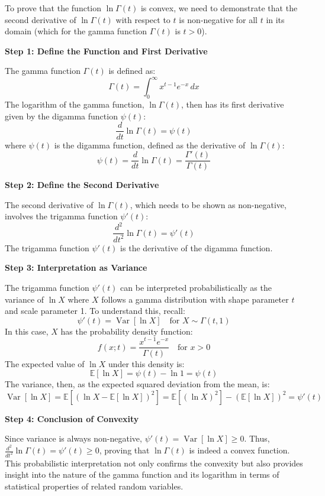 \documentclass[8pt]{article}
\begin{document}
To prove that the function \(\ln \Gamma(t)\) is convex, we need to demonstrate that the second derivative of \(\ln \Gamma(t)\) with respect to \(t\) is non-negative for all \(t\) in its domain (which for the gamma function \(\Gamma(t)\) is \(t > 0\)).

\textbf{Step 1: Define the Function and First Derivative}

The gamma function \(\Gamma(t)\) is defined as:
\[
\Gamma(t) = \int_0^\infty x^{t-1} e^{-x} \, dx
\]
The logarithm of the gamma function, \(\ln \Gamma(t)\), then has its first derivative given by the digamma function \(\psi(t)\):
\[
\frac{d}{dt} \ln \Gamma(t) = \psi(t)
\]
where \(\psi(t)\) is the digamma function, defined as the derivative of \(\ln \Gamma(t)\):
\[
\psi(t) = \frac{d}{dt} \ln \Gamma(t) = \frac{\Gamma'(t)}{\Gamma(t)}
\]

\textbf{Step 2: Define the Second Derivative}

The second derivative of \(\ln \Gamma(t)\), which needs to be shown as non-negative, involves the trigamma function \(\psi'(t)\):
\[
\frac{d^2}{dt^2} \ln \Gamma(t) = \psi'(t)
\]
The trigamma function \(\psi'(t)\) is the derivative of the digamma function.

\textbf{Step 3: Interpretation as Variance}

The trigamma function \(\psi'(t)\) can be interpreted probabilistically as the variance of \(\ln X\) where \(X\) follows a gamma distribution with shape parameter \(t\) and scale parameter 1. To understand this, recall:
\[
\psi'(t) = \operatorname{Var}[\ln X] \quad \text{for } X \sim \Gamma(t, 1)
\]
In this case, \(X\) has the probability density function:
\[
f(x; t) = \frac{x^{t-1} e^{-x}}{\Gamma(t)} \quad \text{for } x > 0
\]
The expected value of \(\ln X\) under this density is:
\[
\mathbb{E}[\ln X] = \psi(t) - \ln 1 = \psi(t)
\]
The variance, then, as the expected squared deviation from the mean, is:
\[
\operatorname{Var}[\ln X] = \mathbb{E}[(\ln X - \mathbb{E}[\ln X])^2] = \mathbb{E}[(\ln X)^2] - (\mathbb{E}[\ln X])^2 = \psi'(t)
\]

\textbf{Step 4: Conclusion of Convexity}

Since variance is always non-negative, \(\psi'(t) = \operatorname{Var}[\ln X] \geq 0\). Thus, \(\frac{d^2}{dt^2} \ln \Gamma(t) = \psi'(t) \geq 0\), proving that \(\ln \Gamma(t)\) is indeed a convex function. This probabilistic interpretation not only confirms the convexity but also provides insight into the nature of the gamma function and its logarithm in terms of statistical properties of related random variables.
\end{document}
